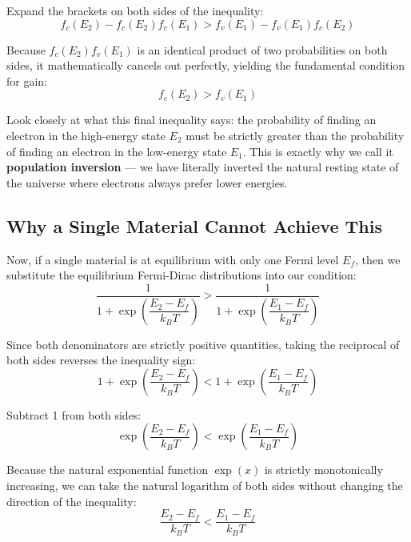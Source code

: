 Expand the brackets on both sides of the inequality:
\begin{equation*}
    f_c(E_2) - f_c(E_2)f_v(E_1) > f_v(E_1) - f_v(E_1)f_c(E_2)
\end{equation*}

Because $f_c(E_2)f_v(E_1)$ is an identical product of two probabilities on both sides, it mathematically cancels out perfectly, yielding the fundamental condition for gain:
\begin{equation*}
    f_c(E_2) > f_v(E_1)
\end{equation*}

Look closely at what this final inequality says: the probability of finding an electron in the high-energy state $E_2$ must be strictly greater than the probability of finding an electron in the low-energy state $E_1$. This is exactly why we call it \textbf{population inversion} — we have literally inverted the natural resting state of the universe where electrons always prefer lower energies.

\subsection{Why a Single Material Cannot Achieve This}

Now, if a single material is at equilibrium with only one Fermi level $E_f$, then we substitute the equilibrium Fermi-Dirac distributions into our condition:
\begin{equation*}
    \frac{1}{1+\exp\!\left(\dfrac{E_2 - E_f}{k_B T}\right)} > \frac{1}{1+\exp\!\left(\dfrac{E_1 - E_f}{k_B T}\right)}
\end{equation*}

Since both denominators are strictly positive quantities, taking the reciprocal of both sides reverses the inequality sign:
\begin{equation*}
    1 + \exp\!\left(\frac{E_2 - E_f}{k_B T}\right) < 1 + \exp\!\left(\frac{E_1 - E_f}{k_B T}\right)
\end{equation*}

Subtract 1 from both sides:
\begin{equation*}
    \exp\!\left(\frac{E_2 - E_f}{k_B T}\right) < \exp\!\left(\frac{E_1 - E_f}{k_B T}\right)
\end{equation*}

Because the natural exponential function $\exp(x)$ is strictly monotonically increasing, we can take the natural logarithm of both sides without changing the direction of the inequality:
\begin{equation*}
    \frac{E_2 - E_f}{k_B T} < \frac{E_1 - E_f}{k_B T}
\end{equation*}

